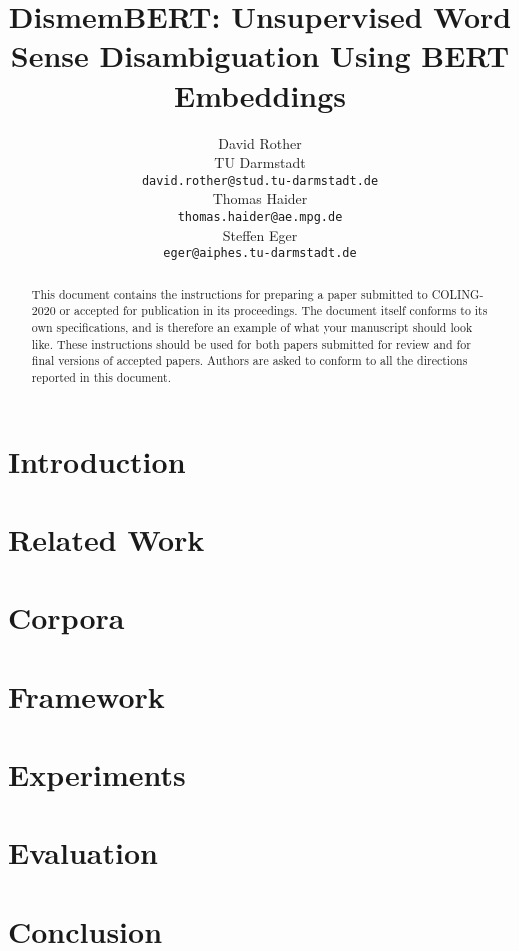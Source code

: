\documentclass[11pt]{article}
\title{DismemBERT: Unsupervised Word Sense Disambiguation Using BERT Embeddings}
\author{David Rother \\
  TU Darmstadt \\
  {\tt david.rother@stud.tu-darmstadt.de} \\\And
  Thomas Haider \\
  {\tt thomas.haider@ae.mpg.de} \\\And
  Steffen Eger \\
  {\tt eger@aiphes.tu-darmstadt.de} \\}
\date{}
\begin{document}
\maketitle
\begin{abstract}
  This document contains the instructions for preparing a paper submitted
  to COLING-2020 or accepted for publication in its proceedings. The document itself
  conforms to its own specifications, and is therefore an example of
  what your manuscript should look like. These instructions should be
  used for both papers submitted for review and for final versions of
  accepted papers. Authors are asked to conform to all the directions
  reported in this document.
\end{abstract}

\section{Introduction}

\section{Related Work}

\section{Corpora}

\section{Framework}

\section{Experiments}
\section{Evaluation}
\section{Conclusion}



\end{document}
